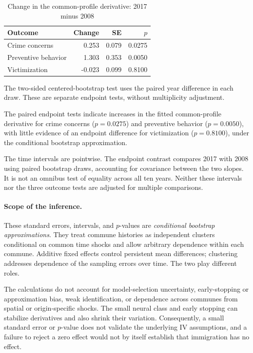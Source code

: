 \documentclass{article}
\begin{document}
\begin{table}[H]
\centering
\caption{Change in the common-profile derivative: 2017 minus 2008}
\label{tab:neural-time-contrast}
\small
\begin{tabularx}{\linewidth}{@{}Xrrr@{}}
\toprule
Outcome & Change & SE & $p$\\
\midrule
Crime concerns & 0.253 & 0.079 & 0.0275\\
Preventive behavior & 1.303 & 0.353 & 0.0050\\
Victimization & -0.023 & 0.099 & 0.8100\\
\bottomrule
\end{tabularx}
\smallskip
\parbox{\linewidth}{\footnotesize The two-sided centered-bootstrap test uses the paired year difference in each draw. These are separate endpoint tests, without multiplicity adjustment.}
\end{table}

The paired endpoint tests indicate increases in the fitted common-profile derivative for crime concerns ($p=0.0275$) and preventive behavior ($p=0.0050$), with little evidence of an endpoint difference for victimization ($p=0.8100$), under the conditional bootstrap approximation.

The time intervals are pointwise. The endpoint contrast compares 2017 with 2008 using paired bootstrap draws, accounting for covariance between the two slopes. It is not an omnibus test of equality across all ten years. Neither these intervals nor the three outcome tests are adjusted for multiple comparisons.

\paragraph{Scope of the inference.}
These standard errors, intervals, and $p$-values are \emph{conditional bootstrap approximations}. They treat commune histories as independent clusters conditional on common time shocks and allow arbitrary dependence within each commune. Additive fixed effects control persistent mean differences; clustering addresses dependence of the sampling errors over time. The two play different roles.

The calculations do not account for model-selection uncertainty, early-stopping or approximation bias, weak identification, or dependence across communes from spatial or origin-specific shocks. The small neural class and early stopping can stabilize derivatives and also shrink their variation. Consequently, a small standard error or $p$-value does not validate the underlying IV assumptions, and a failure to reject a zero effect would not by itself establish that immigration has no effect.
\end{document}
